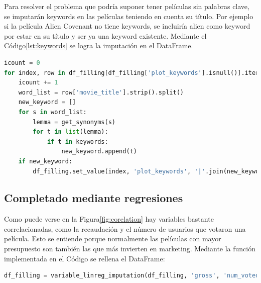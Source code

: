 Para resolver el problema que podría suponer tener películas sin palabras clave, se imputarán keywords en las películas teniendo en cuenta su título. Por ejemplo si la película Alien Covenant no tiene keywords, se incluiría alien como keyword por estar en su título y ser ya una keyword existente. Mediante el Código\ref{lst:keywords} se logra la imputación en el DataFrame.

\begin{lstlisting}[language=Python, caption=Imputación de keywords a partir del título de la película., label ={lst:keywords}]
icount = 0
for index, row in df_filling[df_filling['plot_keywords'].isnull()].iterrows():
    icount += 1
    word_list = row['movie_title'].strip().split()
    new_keyword = []
    for s in word_list:
        lemma = get_synonyms(s)
        for t in list(lemma):
            if t in keywords: 
                new_keyword.append(t)
    if new_keyword:
        df_filling.set_value(index, 'plot_keywords', '|'.join(new_keyword)) 
\end{lstlisting}

\subsection{Completado mediante regresiones}

Como puede verse en la Figura\ref{fig:corelation} hay variables bastante correlacionadas, como la recaudación y el número de usuarios que votaron una película. Esto se entiende porque normalmente las películas con mayor presupuesto son también las que más invierten en marketing. Mediante la función implementada en el Código se rellena el DataFrame:

\begin{lstlisting}[language=Python, caption = Rellenado de la variable de presupuesto teniendo en cuenta el número de votos.]
df_filling = variable_linreg_imputation(df_filling, 'gross', 'num_voted_users')
\end{lstlisting}

